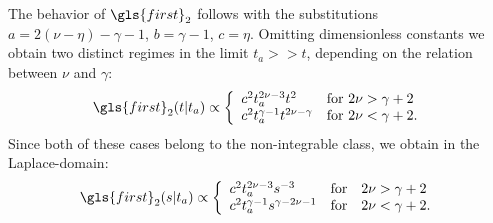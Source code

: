 The behavior of $\gls{first}_{2}$ follows with the substitutions $a= 2(\nu-\eta)-\gamma-1$, $b=\gamma-1$, $c=\eta$. Omitting dimensionless constants we obtain 
two distinct regimes in the limit $t_a>>t$, depending on the relation between $\nu$ and $\gamma$:
\begin{equation}
\gls{first}_{2}(t|t_a) \propto 
\left\{ \begin{array}{l l}
c^2 t_a^{2\nu-3} t^2 & \text{for } 2\nu> \gamma+2\\
c^2 t_a^{\gamma-1} t^{2\nu-\gamma}   & \text{for } 2\nu < \gamma+2 .
\end{array} \right. 
\end{equation}
Since both of these cases belong to the non-integrable class, we obtain in the Laplace-domain:
\begin{equation}
\gls{first}_{2}(s|t_a) \propto   \left\{ \begin{array}{l l l}
c^2 t_a^{2\nu-3} s^{-3} & \mathrm{for} & 2\nu> \gamma+2\\
c^2  t_a^{\gamma-1} s^{\gamma-2\nu-1} & \mathrm{for} & 2\nu < \gamma+2 .
\end{array} \right.
\end{equation}

